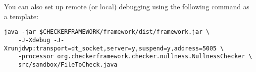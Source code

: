 You can also set up remote (or local) debugging using the following command as a template:

\begin{Verbatim}
java -jar $CHECKERFRAMEWORK/framework/dist/framework.jar \
    -J-Xdebug -J-Xrunjdwp:transport=dt_socket,server=y,suspend=y,address=5005 \
    -processor org.checkerframework.checker.nullness.NullnessChecker \
    src/sandbox/FileToCheck.java

\end{Verbatim}



